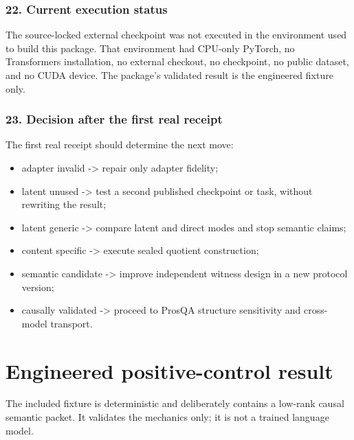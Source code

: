 \documentclass[
  10pt,
]{article}
\providecommand{\tightlist}{%
  \setlength{\itemsep}{0pt}\setlength{\parskip}{0pt}}
\begin{document}
\subsubsection{22. Current execution
status}\label{current-execution-status}

The source-locked external checkpoint was not executed in the
environment used to build this package. That environment had CPU-only
PyTorch, no Transformers installation, no external checkout, no
checkpoint, no public dataset, and no CUDA device. The package's
validated result is the engineered fixture only.

\subsubsection{23. Decision after the first real
receipt}\label{decision-after-the-first-real-receipt}

The first real receipt should determine the next move:

\begin{itemize}
\tightlist
\item
  adapter invalid -\textgreater{} repair only adapter fidelity;
\item
  latent unused -\textgreater{} test a second published checkpoint or
  task, without rewriting the result;
\item
  latent generic -\textgreater{} compare latent and direct modes and
  stop semantic claims;
\item
  content specific -\textgreater{} execute sealed quotient construction;
\item
  semantic candidate -\textgreater{} improve independent witness design
  in a new protocol version;
\item
  causally validated -\textgreater{} proceed to ProsQA structure
  sensitivity and cross-model transport.
\end{itemize}

\newpage

\section{Engineered positive-control
result}\label{engineered-positive-control-result}

The included fixture is deterministic and deliberately contains a
low-rank causal semantic packet. It validates the mechanics only; it is
not a trained language model.
\end{document}
